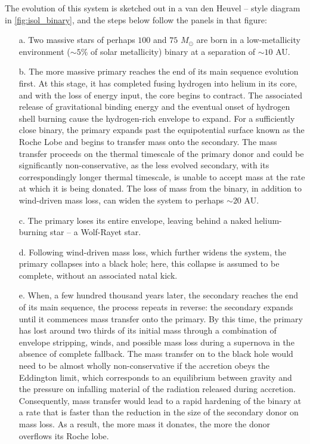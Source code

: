 \documentclass[iop,onecolumn]{revtex4}
\begin{document}
The evolution of this system is sketched out in a van den Heuvel -- style diagram in \autoref{fig:isol_binary}, and the steps below follow the panels in that figure:
\begin{enumerate}  
\item[a.] Two massive stars of perhaps $100$ and $75$ $M_{\odot}$ are born in a low-metallicity environment ($\sim 5\%$ of solar metallicity)  binary at a separation of $\sim 10$ AU.  
\item[b.] The more massive primary reaches the end of its main sequence evolution first.  At this stage, it has completed fusing hydrogen into helium in its core, and with the loss of energy input, the core begins to contract.  The associated release of gravitational binding energy and the eventual onset of hydrogen shell burning cause the hydrogen-rich envelope to expand.  For a sufficiently close binary, the primary expands past the equipotential surface known as the Roche Lobe and begins to transfer mass onto the secondary.  The mass transfer proceeds on the thermal timescale of the primary donor and could be significantly non-conservative, as the less evolved secondary, with its correspondingly longer thermal timescale, is unable to accept mass at the rate at which it is being donated.  The loss of mass from the binary, in addition to wind-driven mass loss, can widen the system to perhaps $\sim 20$ AU.  
\item[c.] The primary loses its entire envelope, leaving behind a naked helium-burning star -- a Wolf-Rayet star.  
\item[d.] Following wind-driven mass loss, which further widens the system, the primary collapses into a black hole; here, this collapse is assumed to be complete, without an associated natal kick.  
\item[e.] When, a few hundred thousand years later, the secondary reaches the end of its main sequence, the process repeats in reverse: the secondary expands until it commences mass transfer onto the primary.  By this time, the primary has lost around two thirds of its initial mass through a combination of envelope stripping, winds, and possible mass loss during a supernova in the absence of complete fallback.  The mass transfer on to the black hole would need to be almost wholly non-conservative if the accretion obeys the Eddington limit, which corresponds to an equilibrium between gravity and the pressure on infalling material of the radiation released during accretion.  Consequently, mass transfer would lead to a rapid hardening of the binary at a rate that is faster than the reduction in the size of the secondary donor on mass loss.  As a result, the more mass it donates, the more the donor overflows its Roche lobe.  

\end{enumerate}
\end{document}
